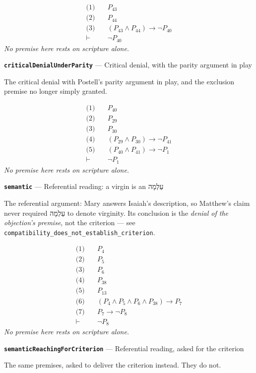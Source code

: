 \documentclass[11pt]{article}
\begin{document}
\begin{align*}
  \text{(1)} \quad & P_{43} \\
  \text{(2)} \quad & P_{44} \\
  \text{(3)} \quad & (P_{43} \land P_{44}) \rightarrow \lnot P_{40} \\
  \vdash \quad & \lnot P_{40}
\end{align*}
\emph{No premise here rests on scripture alone.}
\par\medskip\noindent\textbf{\texttt{critical\allowbreak{}Denial\allowbreak{}Under\allowbreak{}Parity}} --- Critical denial, with the parity argument in play\par\nobreak\noindent
The critical denial with Postell's parity argument in play, and the exclusion premise no longer simply granted.

\begin{align*}
  \text{(1)} \quad & P_{40} \\
  \text{(2)} \quad & P_{29} \\
  \text{(3)} \quad & P_{30} \\
  \text{(4)} \quad & (P_{29} \land P_{30}) \rightarrow \lnot P_{41} \\
  \text{(5)} \quad & (P_{40} \land P_{41}) \rightarrow \lnot P_{1} \\
  \vdash \quad & \lnot P_{1}
\end{align*}
\emph{No premise here rests on scripture alone.}
\par\medskip\noindent\textbf{\texttt{semantic}} --- Referential reading: a virgin is an עַלְמָה\par\nobreak\noindent
The referential argument: Mary answers Isaiah's description, so Matthew's claim never required עַלְמָה to denote virginity. Its conclusion is the \emph{denial of the objection's premise}, not the criterion — see \texttt{compatibility\_\allowbreak{}does\_\allowbreak{}not\_\allowbreak{}establish\_\allowbreak{}criterion}.

\begin{align*}
  \text{(1)} \quad & P_{4} \\
  \text{(2)} \quad & P_{5} \\
  \text{(3)} \quad & P_{6} \\
  \text{(4)} \quad & P_{38} \\
  \text{(5)} \quad & P_{13} \\
  \text{(6)} \quad & (P_{4} \land P_{5} \land P_{6} \land P_{38}) \rightarrow P_{7} \\
  \text{(7)} \quad & P_{7} \rightarrow \lnot P_{8} \\
  \vdash \quad & \lnot P_{8}
\end{align*}
\emph{No premise here rests on scripture alone.}
\par\medskip\noindent\textbf{\texttt{semantic\allowbreak{}Reaching\allowbreak{}For\allowbreak{}Criterion}} --- Referential reading, asked for the criterion\par\nobreak\noindent
The same premises, asked to deliver the criterion instead. They do not.
\end{document}
